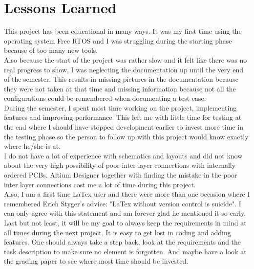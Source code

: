 \section{Lessons Learned}
This project has been educational in many ways. It was my first time using the operating system Free RTOS and I was struggling during the starting phase because of too many new tools.\\
Also because the start of the project was rather slow and it felt like there was no real progress to show, I was neglecting the documentation up until the very end of the semester. This results in missing pictures in the documentation because they were not taken at that time and missing information because not all the configurations could be remembered when documenting a test case.\\
During the semester, I spent most time working on the project, implementing features and improving performance. This left me with little time for testing at the end where I should have stopped development earlier to invest more time in the testing phase so the person to follow up with this project would know exactly where he/she is at.\\
I do not have a lot of experience with schematics and layouts and did not know about the very high possibility of poor inter layer connections with internally ordered PCBs. Altium Designer together with finding the mistake in the poor inter layer connections cost me a lot of time during this project.\\
Also, I am a first time LaTex user and there were more than one occasion where I remembered Erich Styger's advice: "LaTex without version control is suicide". I can only agree with this statement and am forever glad he mentioned it so early.\\
Last but not least, it will be my goal to always keep the requirements in mind at all times during the next project. It is easy to get lost in coding and adding features. One should always take a step back, look at the requirements and the task description to make sure no element is forgotten. And maybe have a look at the grading paper to see where most time should be invested.